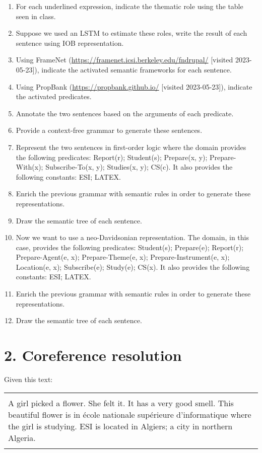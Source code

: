 \documentclass[11pt, a4paper]{article}
\begin{document}
\begin{enumerate}
	\item For each underlined expression, indicate the thematic role using the table seen in class.
	\item Suppose we used an LSTM to estimate these roles, write the result of each sentence using IOB representation.
	\item Using FrameNet (\url{https://framenet.icsi.berkeley.edu/fndrupal/} [visited 2023-05-23]), indicate the activated semantic frameworks for each sentence.
	\item Using PropBank (\url{https://propbank.github.io/} [visited 2023-05-23]), indicate the activated predicates.
	\item Annotate the two sentences based on the arguments of each predicate.
	\item Provide a context-free grammar to generate these sentences.
	\item Represent the two sentences in first-order logic where the domain provides the following predicates:
	Report(r); Student(s); Prepare(x, y); Prepare-With(x); Subscribe-To(x, y); Studies(x, y); CS(c).
	It also provides the following constants: ESI; LATEX.
	\item Enrich the previous grammar with semantic rules in order to generate these representations.
	\item Draw the semantic tree of each sentence.
	\item Now we want to use a neo-Davidsonian representation.
	The domain, in this case, provides the following predicates:
	Student(s); Prepare(e); Report(r); Prepare-Agent(e, x); Prepare-Theme(e, x); Prepare-Instrument(e, x); Location(e, x); Subscribe(e); Study(e); CS(x).
	It also provides the following constants: ESI; LATEX.
	\item Enrich the previous grammar with semantic rules in order to generate these representations.
	\item Draw the semantic tree of each sentence.
\end{enumerate}

\section*{2. Coreference resolution}

Given this text:
\begin{center}
	\begin{tabular}{|p{}|}
	\hline
	\\
	A girl picked a flower.
	She felt it.
	It has a very good smell.
	This beautiful flower is in école nationale supérieure d'informatique where the girl is studying.
	ESI is located in Algiers; a city in northern Algeria.\\
	\\
	\hline
\end{tabular}
\end{center}
\end{document}
